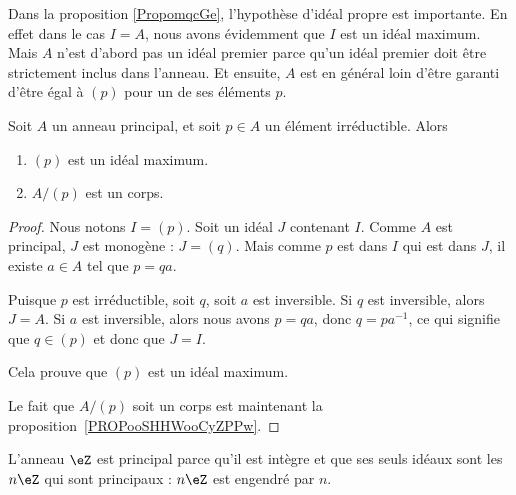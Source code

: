 \begin{normaltext}
	Dans la proposition \ref{PropomqcGe}, l'hypothèse d'idéal propre est importante. En effet dans le cas \( I=A\), nous avons évidemment que \( I\) est un idéal maximum. Mais \( A\) n'est d'abord pas un idéal premier parce qu'un idéal premier doit être strictement inclus dans l'anneau. Et ensuite, \( A\) est en général loin d'être garanti d'être égal à \( (p)\) pour un de ses éléments \( p\).
\end{normaltext}

\begin{proposition}     \label{PropoTMMXCx}
	Soit \( A \) un anneau principal, et soit \( p \in A \) un élément irréductible. Alors
	\begin{enumerate}
		\item
		      \( (p)\) est un idéal maximum.
		\item       \label{ITEMooKPJQooWuPZXS}
		      \( A/(p)\) est un corps.
	\end{enumerate}
\end{proposition}

\begin{proof}
	Nous notons \( I=(p)\). Soit un idéal \( J\) contenant \( I\). Comme \( A\) est principal, \( J\) est monogène : \( J=(q)\). Mais comme \( p\) est dans \( I\) qui est dans \( J\), il existe \( a\in A\) tel que \( p=qa\).

	Puisque \( p\) est irréductible, soit \( q\), soit \( a\) est inversible. Si \( q\) est inversible, alors \( J=A\). Si \( a\) est inversible, alors nous avons \( p=qa\), donc \( q=pa^{-1}\), ce qui signifie que \( q\in(p)\) et donc que \( J=I\).

	Cela prouve que \( (p)\) est un idéal maximum.

	Le fait que \( A/(p)\) soit un corps est maintenant la proposition~\ref{PROPooSHHWooCyZPPw}.
\end{proof}

\begin{example}
	L'anneau \( \eZ\) est principal parce qu'il est intègre et que ses seuls idéaux sont les \( n\eZ\) qui sont principaux : \( n\eZ\) est engendré par \( n\).
\end{example}

